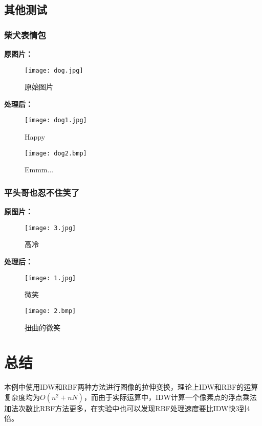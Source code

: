\documentclass[14pt]{scrartcl} %
\begin{document}
\subsection{其他测试}

\subsubsection{柴犬表情包}
\textbf{原图片：}

\begin{figure}[h] %
	\centering
	\texttt{[image: dog.jpg]} %
	\caption{原始图片}
\end{figure}

\pagebreak
\textbf{处理后：}

\begin{figure}[h] %
	\begin{minipage}[t]{0.5\linewidth}
		\centering
		\texttt{[image: dog1.jpg]}
		\caption{Happy}
	\end{minipage}%
	\begin{minipage}[t]{0.5\linewidth}
		\centering
		\texttt{[image: dog2.bmp]}
		\caption{Emmm...}
	\end{minipage}
\end{figure}

\subsubsection{平头哥也忍不住笑了}
\textbf{原图片：}

\begin{figure}[h] %
	\centering
	\texttt{[image: 3.jpg]} %
	\caption{高冷}
\end{figure}

\pagebreak
\textbf{处理后：}

\begin{figure}[h] %
	\begin{minipage}[t]{0.5\linewidth}
		\centering
		\texttt{[image: 1.jpg]}
		\caption{微笑}
	\end{minipage}%
	\begin{minipage}[t]{0.5\linewidth}
		\centering
		\texttt{[image: 2.bmp]}
		\caption{扭曲的微笑}
	\end{minipage}
\end{figure}

\section{总结}
本例中使用IDW和RBF两种方法进行图像的拉伸变换，理论上IDW和RBF的运算复杂度均为$O(n^2+nN)$，而由于实际运算中，IDW计算一个像素点的浮点乘法加法次数比RBF方法更多，在实验中也可以发现RBF处理速度要比IDW快3到4倍。



\end{document}
